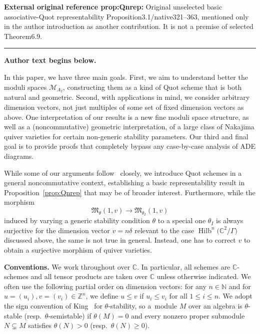 \documentclass[11pt]{article}
\numberwithin{equation}{section}
\newcommand{\SC}{\mathbb{C}} %
\newcommand{\PiQ}{A}
\DeclareMathOperator{\Hilb}{\mathrm{Hilb}}
\numberwithin{equation}{section}
\begin{document}
\noindent\textbf{External original reference prop:Qnrep:} Original unselected basic associative-Quot representability Proposition3.1/native321–363, mentioned only in the author introduction as another contribution. It is not a premise of selected Theorem6.9.\par
\medskip\hrule\medskip\noindent\textbf{Author text begins below.}\par
\setcounter{section}{1}
In this paper, we have three main goals.
First, we aim to
understand better the moduli spaces $\mathcal{M}_{\PiQ_I}$,
constructing them as a kind of Quot scheme
that is both natural and geometric.
Second, with applications in mind, we consider arbitrary dimension vectors, not just multiples of some set of fixed dimension vectors as above. One interpretation of our results is a new fine moduli space structure, as well as a (noncommutative)
geometric interpretation, of a large class of
Nakajima quiver varieties for certain non-generic stability parameters.
Our third and final goal is to provide proofs that completely bypass any case-by-case analysis of ADE diagrams.


While some of our
arguments follow~\cite{craw2019punctual} closely,
we introduce
Quot schemes in a general noncommutative
context, establishing a basic representability result in Proposition~\ref{prop:Qnrep} that may be of broader interest. Furthermore, while the
morphism
\[ \mathfrak{M}_\theta(1,v) \longrightarrow \mathfrak{M}_{\theta_I}(1,v) \]
induced by varying a generic stability condition $\theta$ to a special one $\theta_I$ is always surjective for the
dimension vector $v=n\delta$ relevant to the case $\Hilb^n\big(\SC^2/\Gamma\big)$ discussed above,
the same is not true in general.
Instead, one has to correct $v$ to
obtain a surjective morphism of quiver varieties.


\noindent
\textbf{Conventions.}
 We work throughout over $\SC$. In particular, all schemes are $\SC$-schemes and all tensor products are taken over $\SC$ unless otherwise indicated. We often use the following partial order on dimension vectors: for any $n\in \mathbb{N}$ and for $u=(u_i),v=(v_i)\in \mathbb{Z}^n$, we define $u\le v$ if $u_i\le v_i$ for all $1\leq i\leq n$. We adopt the sign convention of King~\cite{king1994moduli} for $\theta$-stability, so a~module $M$ over an algebra is $\theta$-stable (resp.\ $\theta$-semistable) if $\theta(M)=0$ and every nonzero proper submodule $N\subsetneq M$ satisfies $\theta(N)>0$ (resp.\ $\theta(N)\ge 0$).
\end{document}

